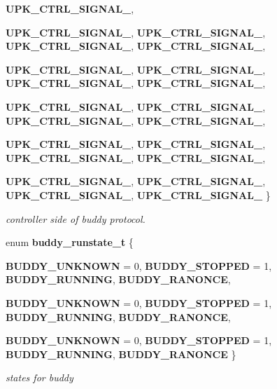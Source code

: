 \begin{DoxyCompactItemize}
{\bf UPK\_\-CTRL\_\-SIGNAL\_}, 
\par
{\bf UPK\_\-CTRL\_\-SIGNAL\_}, 
{\bf UPK\_\-CTRL\_\-SIGNAL\_}, 
{\bf UPK\_\-CTRL\_\-SIGNAL\_}, 
{\bf UPK\_\-CTRL\_\-SIGNAL\_}, 
\par
{\bf UPK\_\-CTRL\_\-SIGNAL\_}, 
{\bf UPK\_\-CTRL\_\-SIGNAL\_}, 
{\bf UPK\_\-CTRL\_\-SIGNAL\_}, 
{\bf UPK\_\-CTRL\_\-SIGNAL\_}, 
\par
{\bf UPK\_\-CTRL\_\-SIGNAL\_}, 
{\bf UPK\_\-CTRL\_\-SIGNAL\_}, 
{\bf UPK\_\-CTRL\_\-SIGNAL\_}, 
{\bf UPK\_\-CTRL\_\-SIGNAL\_}, 
\par
{\bf UPK\_\-CTRL\_\-SIGNAL\_}, 
{\bf UPK\_\-CTRL\_\-SIGNAL\_}, 
{\bf UPK\_\-CTRL\_\-SIGNAL\_}, 
{\bf UPK\_\-CTRL\_\-SIGNAL\_}, 
\par
{\bf UPK\_\-CTRL\_\-SIGNAL\_}, 
{\bf UPK\_\-CTRL\_\-SIGNAL\_}, 
{\bf UPK\_\-CTRL\_\-SIGNAL\_}, 
{\bf UPK\_\-CTRL\_\-SIGNAL\_}
 \}
\begin{DoxyCompactList}\small\item\em controller side of buddy protocol. \end{DoxyCompactList}\item 
enum {\bf buddy\_\-runstate\_\-t} \{ \par
{\bf BUDDY\_\-UNKNOWN} =  0, 
{\bf BUDDY\_\-STOPPED} =  1, 
{\bf BUDDY\_\-RUNNING}, 
{\bf BUDDY\_\-RANONCE}, 
\par
{\bf BUDDY\_\-UNKNOWN} =  0, 
{\bf BUDDY\_\-STOPPED} =  1, 
{\bf BUDDY\_\-RUNNING}, 
{\bf BUDDY\_\-RANONCE}, 
\par
{\bf BUDDY\_\-UNKNOWN} =  0, 
{\bf BUDDY\_\-STOPPED} =  1, 
{\bf BUDDY\_\-RUNNING}, 
{\bf BUDDY\_\-RANONCE}
 \}
\begin{DoxyCompactList}\small\item\em states for buddy \end{DoxyCompactList}\end{DoxyCompactItemize}
